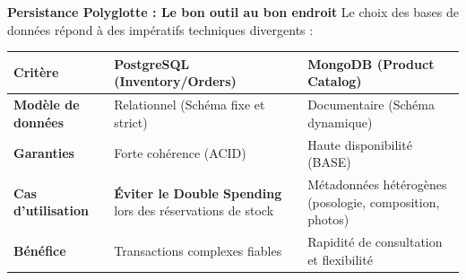 \documentclass[10pt,aspectratio=169]{beamer}
\begin{document}
\begin{frame}{\textbf{Persistance Polyglotte : Le bon outil au bon endroit}}
    Le choix des bases de données répond à des impératifs techniques divergents :
    
    \vspace{2ex}
    \begin{table}
        \centering
        \renewcommand{\arraystretch}{1.3}
        \begin{tabularx}{\textwidth}{l X X}
            \toprule
            \textbf{Critère} & \textbf{PostgreSQL (Inventory/Orders)} & \textbf{MongoDB (Product Catalog)} \\
            \midrule
            \textbf{Modèle de données} & Relationnel (Schéma fixe et strict) & Documentaire (Schéma dynamique) \\
            \textbf{Garanties} & Forte cohérence (ACID) & Haute disponibilité (BASE) \\
            \textbf{Cas d'utilisation} & \textbf{Éviter le Double Spending} lors des réservations de stock & Métadonnées hétérogènes (posologie, composition, photos) \\
            \textbf{Bénéfice} & Transactions complexes fiables & Rapidité de consultation et flexibilité \\
            \bottomrule
        \end{tabularx}
    \end{table}
\end{frame}
\end{document}

